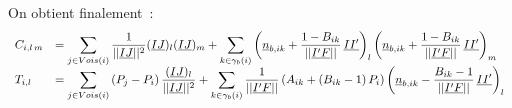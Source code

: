 On obtient finalement~:
\begin{equation}
\begin{array}{ll}
C_{i,l\,m} &= \displaystyle
\sum\limits_{j\in Vois(i)}\frac{1}{||\underline{IJ}||^2}(\underline{IJ})_l(\underline{IJ})_m
+\sum\limits_{k\in \gamma_b(i)}\left(\underline{n}_{b,ik}+\frac{1-B_{ik}}{||\underline{I'F}||}\,\underline{II'}\right)_{l}
                               \left(\underline{n}_{b,ik}+\frac{1-B_{ik}}{||\underline{I'F}||}\,\underline{II'}\right)_{m}\\
T_{i,l} &=\displaystyle
\sum\limits_{j\in Vois(i)}\left(P_j-P_i\right)\frac{(\underline{IJ})_l}{||\underline{IJ}||^2}
+\sum\limits_{k\in\gamma_b(i)}\frac{1}{||\underline{I'F}||}\left(A_{ik}+(B_{ik}-1)\,P_i\right)
                             \left(\underline{n}_{b,ik}-\frac{B_{ik}-1}{||\underline{I'F}||}\,\underline{II'}\right)_{l}
\end{array}
\end{equation}

